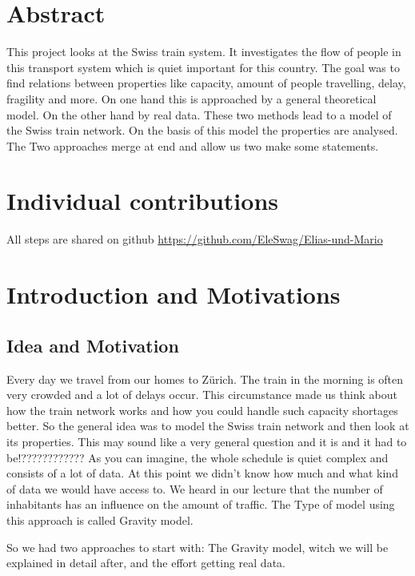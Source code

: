 \documentclass[11pt]{article}
\begin{document}
\section{Abstract}

This project looks at the Swiss train system. It investigates the flow of people in this transport system which is quiet important for this country. The goal was to find relations between properties like capacity, amount of people travelling, delay, fragility and more. On one hand this is approached  by a general theoretical model. On the other hand by real data. These two methods lead to a model of the Swiss train  network. On the basis of this model the properties are analysed. The Two approaches merge at end and allow us two make some statements.
 

\section{Individual contributions}

All steps are shared on github \citep{Github}
\url{https://github.com/EleSwag/Elias-und-Mario}

\section{Introduction and Motivations}

\subsection{Idea and Motivation}


Every day we travel from our homes to Zürich. The train in the morning is often very crowded and a lot of delays occur. This circumstance made us think about how the train network works and how you could handle such capacity shortages better. 
So the general idea was to model the Swiss train network and then look at its properties. This may sound like a very general question and it is and it had to be!???????????? As you can imagine, the whole schedule is quiet complex and consists of a lot of data. At this point we didn't know how much and what kind of data we would have access to. We heard in our lecture that the number of inhabitants has an influence on the amount of traffic. The Type of model using this approach is called Gravity model.

So we had two approaches to start with: The Gravity model, witch we will be explained in detail after, and the effort getting real data.
\end{document}
